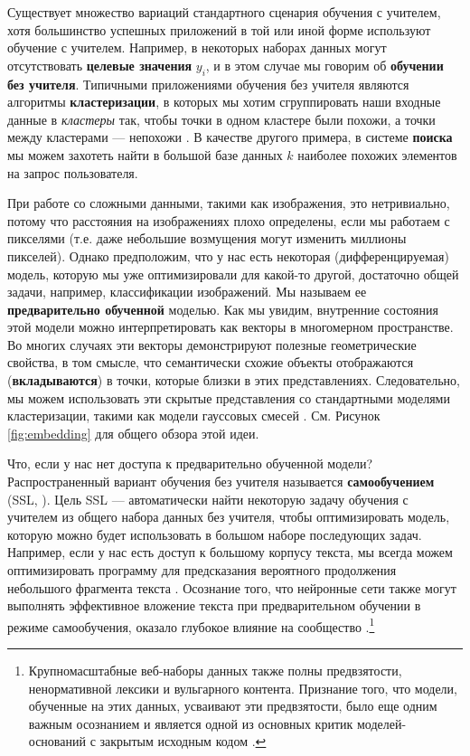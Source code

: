 Существует множество вариаций стандартного сценария обучения с учителем, хотя большинство успешных приложений в той или иной форме используют обучение с учителем. Например, в некоторых наборах данных могут отсутствовать \textbf{целевые значения} $y_i$, и в этом случае мы говорим об \textbf{обучении без учителя}. Типичными приложениями обучения без учителя являются алгоритмы \textbf{кластеризации}, в которых мы хотим сгруппировать наши входные данные в \textit{кластеры} так, чтобы точки в одном кластере были похожи, а точки между кластерами — непохожи \cite{hastie2009elements}. В качестве другого примера, в системе \textbf{поиска} мы можем захотеть найти в большой базе данных $k$ наиболее похожих элементов на запрос пользователя.

При работе со сложными данными, такими как изображения, это нетривиально, потому что расстояния на изображениях плохо определены, если мы работаем с пикселями (т.е. даже небольшие возмущения могут изменить миллионы пикселей). Однако предположим, что у нас есть некоторая (дифференцируемая) модель, которую мы уже оптимизировали для какой-то другой, достаточно общей задачи, например, классификации изображений. Мы называем ее \textbf{предварительно обученной} моделью. Как мы увидим, внутренние состояния этой модели можно интерпретировать как векторы в многомерном пространстве. Во многих случаях эти векторы демонстрируют полезные геометрические свойства, в том смысле, что семантически схожие объекты отображаются (\textbf{вкладываются}) в точки, которые близки в этих представлениях. Следовательно, мы можем использовать эти скрытые представления со стандартными моделями кластеризации, такими как модели гауссовых смесей \cite{huang2014deep}. См. Рисунок \ref{fig:embedding} для общего обзора этой идеи.

Что, если у нас нет доступа к предварительно обученной модели? Распространенный вариант обучения без учителя называется \textbf{самообучением} (SSL, \cite{zbontar2021barlow}). Цель SSL — автоматически найти некоторую задачу обучения с учителем из общего набора данных без учителя, чтобы оптимизировать модель, которую можно будет использовать в большом наборе последующих задач. Например, если у нас есть доступ к большому корпусу текста, мы всегда можем оптимизировать программу для предсказания вероятного продолжения небольшого фрагмента текста \cite{radford2019language}. Осознание того, что нейронные сети также могут выполнять эффективное вложение текста при предварительном обучении в режиме самообучения, оказало глубокое влияние на сообщество \cite{mikolov2013distributed}.\footnote{Крупномасштабные веб-наборы данных также полны предвзятости, ненормативной лексики и вульгарного контента. Признание того, что модели, обученные на этих данных, усваивают эти предвзятости, было еще одним важным осознанием \cite{bolukbasi2016man} и является одной из основных критик моделей-оснований с закрытым исходным кодом \cite{bender2021dangers}.}

